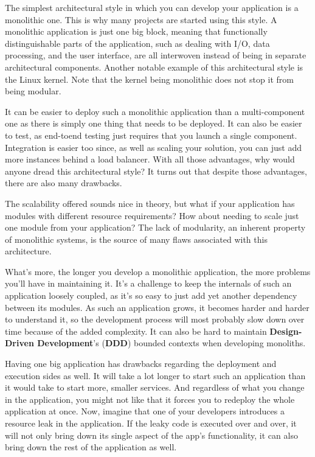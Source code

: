 The simplest architectural style in which you can develop your application is a monolithic one. This is why many projects are started using this style. A monolithic application is just one big block, meaning that functionally distinguishable parts of the application, such as dealing with I/O, data processing, and the user interface, are all interwoven instead of being in separate architectural components. Another notable example of this architectural style is the Linux kernel. Note that the kernel being monolithic does not stop it from being modular.

It can be easier to deploy such a monolithic application than a multi-component one as there is simply one thing that needs to be deployed. It can also be easier to test, as end-toend testing just requires that you launch a single component. Integration is easier too since, as well as scaling your solution, you can just add more instances behind a load balancer. With all those advantages, why would anyone dread this architectural style? It turns out that despite those advantages, there are also many drawbacks.

The scalability offered sounds nice in theory, but what if your application has modules with different resource requirements? How about needing to scale just one module from your application? The lack of modularity, an inherent property of monolithic systems, is the source of many flaws associated with this architecture.

What's more, the longer you develop a monolithic application, the more problems you'll have in maintaining it. It's a challenge to keep the internals of such an application loosely coupled, as it's so easy to just add yet another dependency between its modules. As such an application grows, it becomes harder and harder to understand it, so the development process will most probably slow down over time because of the added complexity. It can also be hard to maintain \textbf{Design-Driven Development}'s (\textbf{DDD}) bounded contexts when developing monoliths.

Having one big application has drawbacks regarding the deployment and execution sides as well. It will take a lot longer to start such an application than it would take to start more, smaller services. And regardless of what you change in the application, you might not like that it forces you to redeploy the whole application at once. Now, imagine that one of your developers introduces a resource leak in the application. If the leaky code is executed over and over, it will not only bring down its single aspect of the app's functionality, it can also bring down the rest of the application as well.

